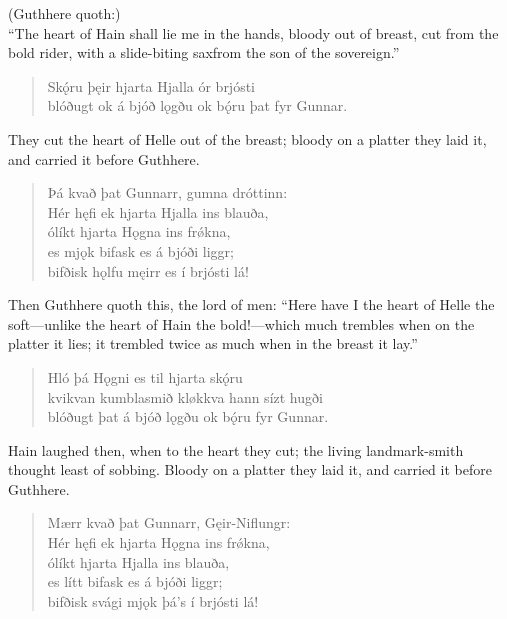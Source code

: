 \bvb (Guthhere quoth:) \\ “The heart of Hain shall lie me in the hands, bloody out of breast, cut from the bold rider, with a slide-biting sax\footnotemark[15] from the son of the sovereign.”

\begin{verse}
\bva Skǫ́ru þęir hjarta \hld Hjalla ór brjósti \\%
blóðugt ok á bjóð lǫgðu \hld ok bǫ́ru þat fyr Gunnar.\\%
\end{verse}

\bvb They cut the heart of Helle out of the breast; bloody on a platter they laid it, and carried it before Guthhere.

\begin{verse}
\bva Þá kvað þat Gunnarr, \hld gumna dróttinn: \\%
Hér hęfi ek hjarta \hld Hjalla ins blauða, \\%
ólíkt hjarta \hld Hǫgna ins frǿkna, \\%
es mjǫk bifask \hld es á bjóði liggr; \\%
bifðisk hǫlfu męirr \hld es í brjósti lá!\\%
\end{verse}

\bvb Then Guthhere quoth this, the lord of men: “Here have I the heart of Helle the soft—unlike the heart of Hain the bold!—which much trembles when on the platter it lies; it trembled twice as much when in the breast it lay.”

\begin{verse}
\bva Hló þá Hǫgni \hld es til hjarta skǫ́ru \\%
kvikvan kumblasmið \hld kløkkva hann sízt hugði \\%
blóðugt þat á bjóð lǫgðu \hld ok bǫ́ru fyr Gunnar.\\%
\end{verse}

\bvb Hain laughed then, when to the heart they cut; the living landmark-smith thought least of sobbing. Bloody on a platter they laid it, and carried it before Guthhere.

\begin{verse}
\bva Mærr kvað þat Gunnarr, \hld Gęir-Niflungr: \\%
Hér hęfi ek hjarta \hld Hǫgna ins frǿkna, \\%
ólíkt hjarta \hld Hjalla ins blauða, \\%
es lítt bifask \hld es á bjóði liggr; \\%
bifðisk svági mjǫk \hld þá’s í brjósti lá!\\%
\end{verse}

